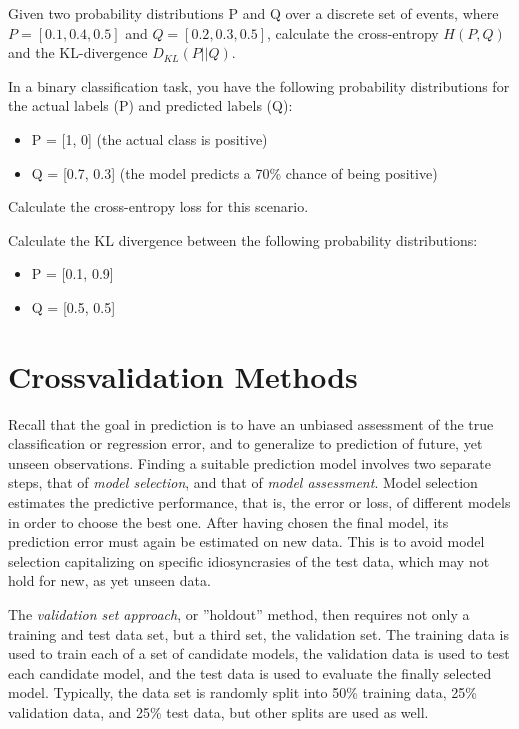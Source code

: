 \begin{exercisebox}
Given two probability distributions P and Q over a discrete set of events, where $P = [0.1, 0.4, 0.5]$ and $Q = [0.2, 0.3, 0.5]$, calculate the cross-entropy $H(P, Q)$ and the KL-divergence $D_{KL}(P || Q)$.
\end{exercisebox}

\begin{exercisebox}
In a binary classification task, you have the following probability distributions for the actual labels (P) and predicted labels (Q):
\begin{itemize}
  \item P = [1, 0] (the actual class is positive)
  \item Q = [0.7, 0.3] (the model predicts a 70\% chance of being positive)
\end{itemize}
Calculate the cross-entropy loss for this scenario.
\end{exercisebox}

\begin{exercisebox}
Calculate the KL divergence between the following probability distributions:
  \begin{itemize}
     \item P = [0.1, 0.9]
     \item Q = [0.5, 0.5]
  \end{itemize}
\end{exercisebox}

\section{Crossvalidation Methods}

Recall that the goal in prediction is to have an unbiased assessment of the true classification or regression error, and to generalize to prediction of future, yet unseen observations. Finding a suitable prediction model involves two separate steps, that of \emph{model selection}, and that of \emph{model assessment}. Model selection estimates the predictive performance, that is, the error or loss, of different models in order to choose the best one. After having chosen the final model, its prediction error must again be estimated on new data. This is to avoid model selection capitalizing on specific idiosyncrasies of the test data, which may not hold for new, as yet unseen data.

The \emph{validation set approach}, or ''holdout'' method, then requires not only a training and test data set, but a third set, the validation set. The training data is used to train each of a set of candidate models, the validation data is used to test each candidate model, and the test data is used to evaluate the finally selected model. Typically, the data set is randomly split into 50\% training data, 25\% validation data, and 25\% test data, but other splits are used as well. 

